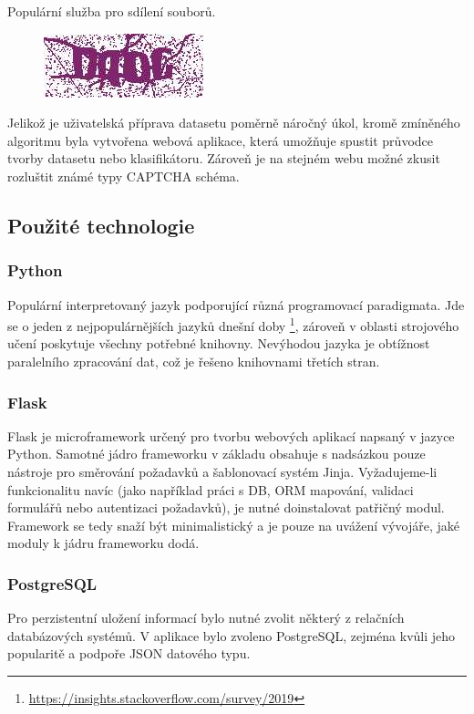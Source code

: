 \documentclass[
  field=ainfp,
  master=true,
  biblatex,
  sourcecodes=false,
  theorems=false,
  glossaries,
  index
]{kidiplom}
\begin{document}
\begin{description}[align=left]
\item  [ulozto.cz] Populární služba pro sdílení souborů.
\begin{figure}[H]
  \centering
  \includegraphics{images/ulozto.jpg}
\end{figure}
\end{description}


Jelikož je uživatelská příprava datasetu poměrně náročný úkol, kromě zmíněného algoritmu byla vytvořena webová aplikace, která umožňuje spustit průvodce tvorby datasetu nebo klasifikátoru. Zároveň je na stejném webu možné zkusit rozluštit známé typy CAPTCHA schéma. 

\subsection{Použité technologie}
\subsubsection*{Python}
Populární interpretovaný jazyk podporující různá programovací paradigmata. Jde  se o jeden z nejpopulárnějších jazyků dnešní doby \footnote{\url{https://insights.stackoverflow.com/survey/2019}}, zároveň v oblasti strojového učení poskytuje všechny potřebné knihovny. Nevýhodou jazyka je obtížnost paralelního zpracování dat, což je řešeno knihovnami třetích stran.

\subsubsection*{Flask}
Flask je microframework určený pro tvorbu webových aplikací napsaný v jazyce Python. Samotné jádro frameworku v základu obsahuje s nadsázkou pouze nástroje pro směrování požadavků a šablonovací systém Jinja. Vyžadujeme-li funkcionalitu navíc (jako například práci s DB, ORM mapování, validaci formulářů nebo autentizaci požadavků), je nutné doinstalovat patřičný modul. Framework se tedy snaží být minimalistický a je pouze na uvážení vývojáře, jaké moduly k jádru frameworku dodá. 
\subsubsection*{PostgreSQL}
Pro perzistentní uložení informací bylo nutné zvolit některý z relačních databázových systémů. V aplikace bylo zvoleno PostgreSQL, zejména kvůli jeho popularitě a podpoře JSON datového typu. 
\end{document}
